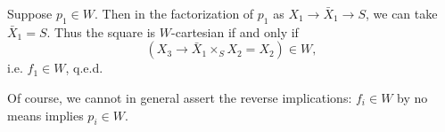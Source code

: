 \documentclass[11pt]{article}
\newcommand{\msp}[1]{\marginpar{\footnotesize [#1]}}
\begin{document}
\msp{page 261}
Suppose $p_1\in W$. Then in the factorization of $p_1$ as $X_1\longrightarrow\bar{X}_1\longrightarrow S$, we can take $\bar{X}_1=S$. Thus the square is $W$-cartesian if and only if
\[
(X_3\longrightarrow\bar{X}_1\times_S X_2=X_2)\in W,
\]
i.e. $f_1\in W$, q.e.d.

Of course, we cannot in general assert the reverse implications: $f_i\in W$ by no means implies $p_i\in W$.
\end{document}
